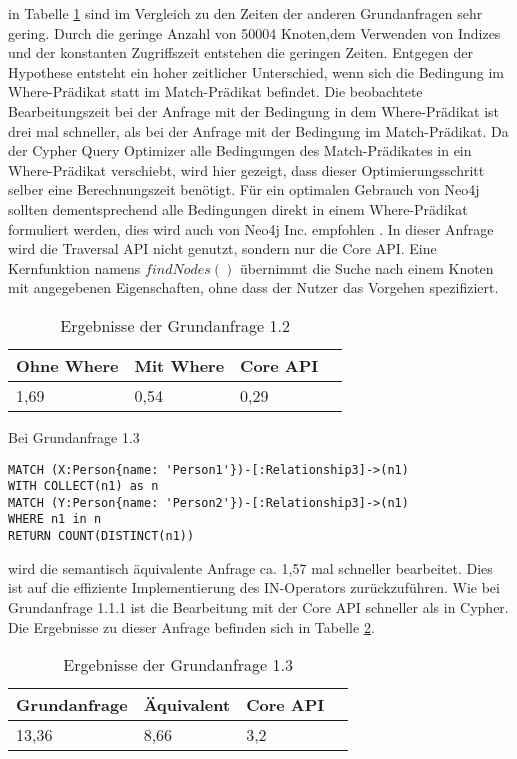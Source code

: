   in Tabelle \ref{tab:Query1_2} sind im Vergleich zu den Zeiten der anderen Grundanfragen sehr gering. Durch die geringe Anzahl von 50004 Knoten,dem Verwenden von Indizes und der konstanten Zugriffszeit entstehen die geringen Zeiten. \newline Entgegen der Hypothese entsteht ein hoher zeitlicher Unterschied, wenn sich die Bedingung im Where-Prädikat statt im Match-Prädikat 	befindet. Die beobachtete Bearbeitungszeit bei der Anfrage mit der Bedingung in dem Where-Prädikat ist drei mal schneller, als bei der Anfrage mit der Bedingung im Match-Prädikat. Da der Cypher Query Optimizer alle Bedingungen des Match-Prädikates in ein Where-Prädikat verschiebt, wird hier gezeigt, dass dieser Optimierungsschritt selber eine  Berechnungszeit benötigt. Für ein optimalen Gebrauch von Neo4j sollten dementsprechend alle Bedingungen direkt in einem Where-Prädikat formuliert werden, dies wird auch von Neo4j Inc. empfohlen \parencite{Optimizer}. \newline
In dieser Anfrage wird die Traversal API nicht genutzt, sondern nur die Core API. Eine Kernfunktion namens $findNodes()$ übernimmt die Suche nach einem Knoten mit angegebenen Eigenschaften, ohne dass der Nutzer das Vorgehen spezifiziert.  
\FloatBarrier
\begin{table}[h]
	\centering
		\begin{tabular}{ |p{3cm}|p{3cm}|p{3cm}|p{3cm}|  }
			\hline
			Ohne Where& Mit Where& Core API  \\
			\hline
			1,69   &  0,54  & 0,29  \\
			\hline
		\end{tabular}
		\FloatBarrier
		\caption{Ergebnisse der Grundanfrage 1.2}
		\label{tab:Query1_2}
\end{table}
 \vskip 2.5cm
\noindent Bei Grundanfrage 1.3
\begin{Verbatim}[frame=single]
MATCH (X:Person{name: 'Person1'})-[:Relationship3]->(n1) 
WITH COLLECT(n1) as n 
MATCH (Y:Person{name: 'Person2'})-[:Relationship3]->(n1) 
WHERE n1 in n
RETURN COUNT(DISTINCT(n1))
\end{Verbatim} 
wird die semantisch äquivalente Anfrage ca. 1,57 mal schneller bearbeitet. Dies ist auf die effiziente Implementierung des IN-Operators zurückzuführen. Wie bei Grundanfrage 1.1.1 ist die Bearbeitung mit der Core API schneller als in Cypher.
Die Ergebnisse zu dieser Anfrage befinden sich in Tabelle	\ref{tab:Query1_3}.
\FloatBarrier
\begin{table}[h]
	\centering
		\begin{tabular}{ |p{3cm}|p{3cm}|p{3cm}|p{3cm}|  }
			\hline
			Grundanfrage & Äquivalent&Core API\\
			\hline
			 13,36    & 8,66 &  3,2\\
			\hline
		\end{tabular}
		\caption{Ergebnisse der Grundanfrage 1.3}
		\label{tab:Query1_3}
\end{table}
\FloatBarrier

